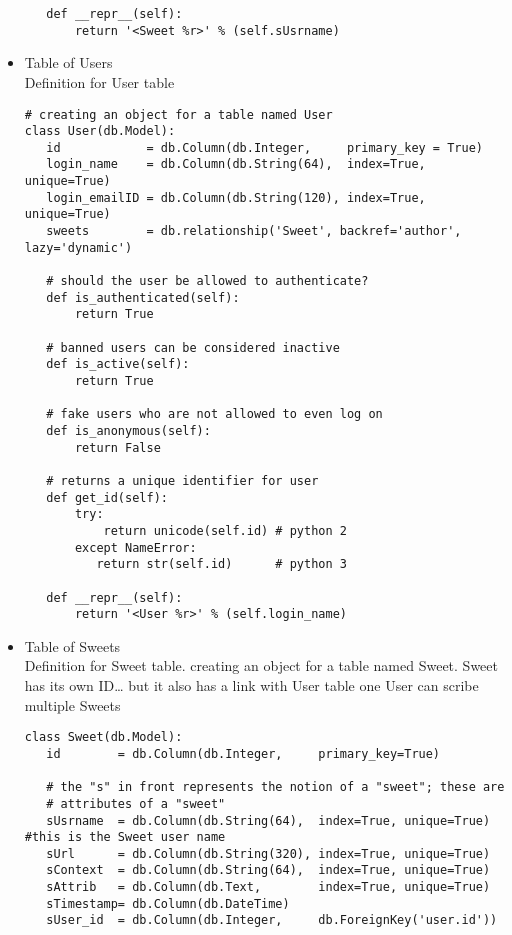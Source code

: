 \documentclass[11pt]{article}
\begin{document}
\begin{itemize}
\begin{verbatim}
   def __repr__(self):
       return '<Sweet %r>' % (self.sUsrname)
\end{verbatim}


\item Table of Users\\
\label{sec-4-2-1-3}%
Definition for User table

\begin{verbatim}
# creating an object for a table named User
class User(db.Model):
   id            = db.Column(db.Integer,     primary_key = True)
   login_name    = db.Column(db.String(64),  index=True, unique=True)
   login_emailID = db.Column(db.String(120), index=True, unique=True)
   sweets        = db.relationship('Sweet', backref='author', lazy='dynamic')

   # should the user be allowed to authenticate?
   def is_authenticated(self):
       return True

   # banned users can be considered inactive    
   def is_active(self):
       return True

   # fake users who are not allowed to even log on
   def is_anonymous(self):
       return False

   # returns a unique identifier for user    
   def get_id(self):
       try:
           return unicode(self.id) # python 2
       except NameError:
          return str(self.id)      # python 3

   def __repr__(self):
       return '<User %r>' % (self.login_name)
\end{verbatim}


\item Table of Sweets\\
\label{sec-4-2-1-4}%
Definition for Sweet table. creating an object for a table named
Sweet. Sweet has its own ID\ldots{} but it also has a link with User table one User can scribe multiple Sweets

\begin{verbatim}
class Sweet(db.Model):
   id        = db.Column(db.Integer,     primary_key=True)

   # the "s" in front represents the notion of a "sweet"; these are
   # attributes of a "sweet"
   sUsrname  = db.Column(db.String(64),  index=True, unique=True) #this is the Sweet user name
   sUrl      = db.Column(db.String(320), index=True, unique=True)
   sContext  = db.Column(db.String(64),  index=True, unique=True)
   sAttrib   = db.Column(db.Text,        index=True, unique=True)
   sTimestamp= db.Column(db.DateTime)
   sUser_id  = db.Column(db.Integer,     db.ForeignKey('user.id'))


\end{verbatim}
\end{itemize}
\end{document}
